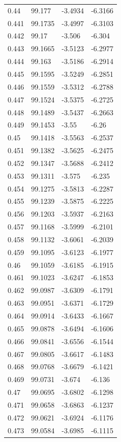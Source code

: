 \begin{tabular}{llll}
0.44 & 99.177 & -3.4934 & -6.3166 \\
0.441 & 99.1735 & -3.4997 & -6.3103 \\
0.442 & 99.17 & -3.506 & -6.304 \\
0.443 & 99.1665 & -3.5123 & -6.2977 \\
0.444 & 99.163 & -3.5186 & -6.2914 \\
0.445 & 99.1595 & -3.5249 & -6.2851 \\
0.446 & 99.1559 & -3.5312 & -6.2788 \\
0.447 & 99.1524 & -3.5375 & -6.2725 \\
0.448 & 99.1489 & -3.5437 & -6.2663 \\
0.449 & 99.1453 & -3.55 & -6.26 \\
0.45 & 99.1418 & -3.5563 & -6.2537 \\
0.451 & 99.1382 & -3.5625 & -6.2475 \\
0.452 & 99.1347 & -3.5688 & -6.2412 \\
0.453 & 99.1311 & -3.575 & -6.235 \\
0.454 & 99.1275 & -3.5813 & -6.2287 \\
0.455 & 99.1239 & -3.5875 & -6.2225 \\
0.456 & 99.1203 & -3.5937 & -6.2163 \\
0.457 & 99.1168 & -3.5999 & -6.2101 \\
0.458 & 99.1132 & -3.6061 & -6.2039 \\
0.459 & 99.1095 & -3.6123 & -6.1977 \\
0.46 & 99.1059 & -3.6185 & -6.1915 \\
0.461 & 99.1023 & -3.6247 & -6.1853 \\
0.462 & 99.0987 & -3.6309 & -6.1791 \\
0.463 & 99.0951 & -3.6371 & -6.1729 \\
0.464 & 99.0914 & -3.6433 & -6.1667 \\
0.465 & 99.0878 & -3.6494 & -6.1606 \\
0.466 & 99.0841 & -3.6556 & -6.1544 \\
0.467 & 99.0805 & -3.6617 & -6.1483 \\
0.468 & 99.0768 & -3.6679 & -6.1421 \\
0.469 & 99.0731 & -3.674 & -6.136 \\
0.47 & 99.0695 & -3.6802 & -6.1298 \\
0.471 & 99.0658 & -3.6863 & -6.1237 \\
0.472 & 99.0621 & -3.6924 & -6.1176 \\
0.473 & 99.0584 & -3.6985 & -6.1115 \\

\end{tabular}
